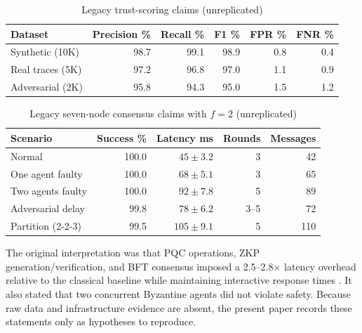 \documentclass[10pt]{article}
\let\cite\citep
\begin{document}
\begin{table}[H]
\centering
\caption{Legacy trust-scoring claims (unreplicated)}
\begin{tabular}{lrrrrr}
\toprule
\textbf{Dataset} & \textbf{Precision \%} & \textbf{Recall \%} & \textbf{F1 \%} & \textbf{FPR \%} & \textbf{FNR \%}\\
\midrule
Synthetic (10K) & 98.7 & 99.1 & 98.9 & 0.8 & 0.4\\
Real traces (5K) & 97.2 & 96.8 & 97.0 & 1.1 & 0.9\\
Adversarial (2K) & 95.8 & 94.3 & 95.0 & 1.5 & 1.2\\
\bottomrule
\end{tabular}
\end{table}

\begin{table}[H]
\centering
\caption{Legacy seven-node consensus claims with $f=2$ (unreplicated)}
\begin{tabular}{lrrrr}
\toprule
\textbf{Scenario} & \textbf{Success \%} & \textbf{Latency ms} & \textbf{Rounds} & \textbf{Messages}\\
\midrule
Normal & 100.0 & $45\pm3.2$ & 3 & 42\\
One agent faulty & 100.0 & $68\pm5.1$ & 3 & 65\\
Two agents faulty & 100.0 & $92\pm7.8$ & 5 & 89\\
Adversarial delay & 99.8 & $78\pm6.2$ & 3--5 & 72\\
Partition (2-2-3) & 99.5 & $105\pm9.1$ & 5 & 110\\
\bottomrule
\end{tabular}
\end{table}

The original interpretation was that PQC operations, ZKP generation/verification, and BFT consensus imposed a 2.5--2.8$\times$ latency overhead relative to the classical baseline while maintaining interactive response times \cite{nielsen1994}. It also stated that two concurrent Byzantine agents did not violate safety. Because raw data and infrastructure evidence are absent, the present paper records these statements only as hypotheses to reproduce.
\end{document}
